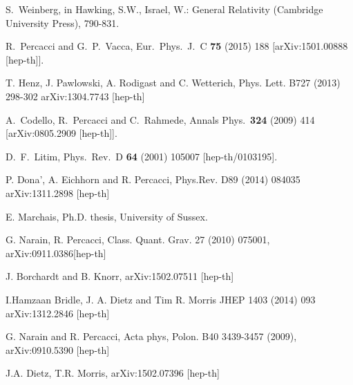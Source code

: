 \documentclass[a4paper,11pt]{revtex4}
\begin{document}
\begin{thebibliography}{99}

S.~Weinberg,
in Hawking, S.W., Israel, W.: General Relativity (Cambridge University Press), 790-831.

  R.~Percacci and G.~P.~Vacca,
  Eur.\ Phys.\ J.\ C {\bf 75} (2015)  188
  [arXiv:1501.00888 [hep-th]].

T. Henz, J. Pawlowski, A. Rodigast and C. Wetterich,
Phys. Lett. B727 (2013) 298-302
arXiv:1304.7743 [hep-th]

A.~Codello, R.~Percacci and C.~Rahmede,
Annals Phys.\  {\bf 324} (2009) 414
[arXiv:0805.2909 [hep-th]].

D.~F.~Litim,
Phys.\ Rev.\ D {\bf 64} (2001) 105007
[hep-th/0103195].

P. Dona', A. Eichhorn and R. Percacci,
Phys.Rev. D89 (2014) 084035
arXiv:1311.2898 [hep-th]

E. Marchais, Ph.D. thesis, University of Sussex.

G. Narain, R. Percacci, Class. Quant. Grav. 27 (2010) 075001,
arXiv:0911.0386[hep-th]

J. Borchardt and B. Knorr,
arXiv:1502.07511 [hep-th]

I.Hamzaan Bridle, J. A. Dietz and Tim R. Morris
JHEP 1403 (2014) 093 
arXiv:1312.2846 [hep-th]

G. Narain and R. Percacci,
Acta phys, Polon. B40 3439-3457 (2009),
arXiv:0910.5390 [hep-th]

J.A. Dietz, T.R. Morris, 
arXiv:1502.07396 [hep-th]


\end{thebibliography}
\end{document}
